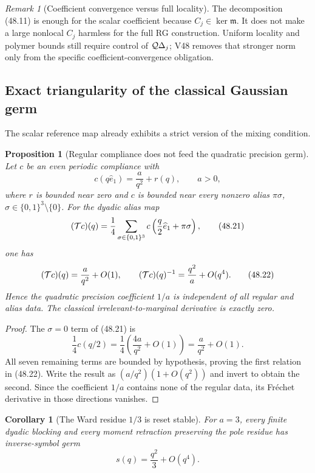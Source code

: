 \documentclass[11pt,oneside]{book}
\newtheorem{proposition}[theorem]{Proposition}
\newtheorem{corollary}[theorem]{Corollary}
\theoremstyle{definition}
\theoremstyle{remark}
\newtheorem{remark}[theorem]{Remark}
\begin{document}
\begin{remark}[Coefficient convergence versus full locality]
\label{rem:e8v48-coeff-vs-locality}
The decomposition (48.11) is enough for the scalar coefficient
because \(C_j\in\ker{\mathfrak m}\).  It does not make a large
nonlocal \(C_j\) harmless for the full RG construction.  Uniform
locality and polymer bounds still require control of
\({\cal Q}\Delta_j\); V48 removes that stronger norm only from the
specific coefficient-convergence obligation.
\end{remark}

\subsection{Exact triangularity of the classical Gaussian germ}

The scalar reference map already exhibits a strict version of the
mixing condition.

\begin{proposition}[Regular compliance does not feed the quadratic
precision germ]
\label{prop:e8v48-classical-triangularity}
Let \(c\) be an even periodic compliance with
\[
 c(q\widehat e_1)=\frac{a}{q^2}+r(q),\qquad a>0,              \tag{48.20}
\]
where \(r\) is bounded near zero and \(c\) is bounded near every
nonzero alias \(\pi\sigma\), \(\sigma\in\{0,1\}^3\setminus\{0\}\).
For the dyadic alias map
\[
 ({\cal T}c)(q)
 =\frac14\sum_{\sigma\in\{0,1\}^3}
 c\left(\frac q2\widehat e_1+\pi\sigma\right),                \tag{48.21}
\]
one has
\[
 ({\cal T}c)(q)=\frac a{q^2}+O(1),\qquad
 ({\cal T}c)(q)^{-1}=\frac{q^2}{a}+O(q^4).                    \tag{48.22}
\]
Hence the quadratic precision coefficient \(1/a\) is independent
of all regular and alias data.  The classical
irrelevant-to-marginal derivative is exactly zero.
\end{proposition}

\begin{proof}
The \(\sigma=0\) term of (48.21) is
\[
 \frac14c(q/2)=\frac14\left(\frac{4a}{q^2}+O(1)\right)
 =\frac a{q^2}+O(1).
\]
All seven remaining terms are bounded by hypothesis, proving the
first relation in (48.22).  Write the result as
\((a/q^2)(1+O(q^2))\) and invert to obtain the second.  Since the
coefficient \(1/a\) contains none of the regular data, its
Fréchet derivative in those directions vanishes.
\end{proof}

\begin{corollary}[The Ward residue \(1/3\) is reset stable]
\label{cor:e8v48-one-third-stable}
For \(a=3\), every finite dyadic blocking and every moment
retraction preserving the pole residue has inverse-symbol germ
\[
 s(q)=\frac{q^2}{3}+O(q^4).                                  \tag{48.23}
\]
\end{corollary}
\end{document}
